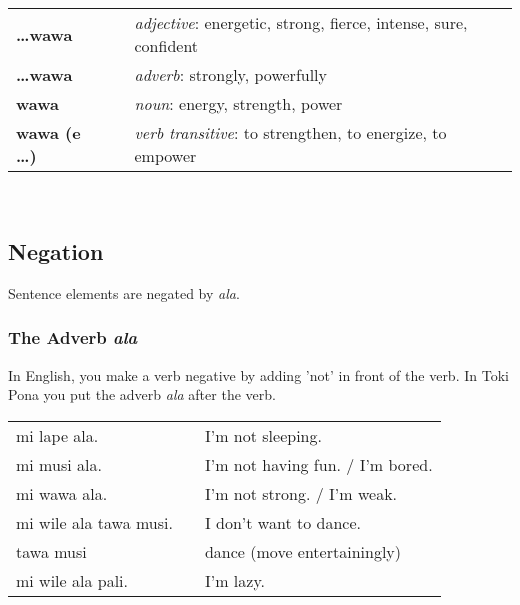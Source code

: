 \begin{supertabular}{p{2,5cm}|ll}
    \textbf{\dots wawa}     &  & \textit{adjective}: energetic, strong, fierce, intense, sure, confident      \\ %
    \textbf{\dots wawa}     &  & \textit{adverb}: strongly, powerfully                                        \\ %
    \textbf{wawa}           &  & \textit{noun}: energy, strength, power                                       \\ %
    \textbf{wawa (e \dots)} &  & \textit{verb transitive}: to strengthen, to energize, to empower             \\ %
\end{supertabular} \\
%
\newpage
%
\subsection*{Negation}
%
%

Sentence elements are negated by \textit{ala}.

\subsubsection*{The Adverb \textit{ala}}
%
%
In English, you make a verb negative by adding 'not' in front of the verb.
In Toki Pona you put the adverb \textit{ala} after the verb.

\begin{supertabular}{p{5,5cm}|ll}
    mi lape ala.           &  & I'm not sleeping.                \\
    mi musi ala.           &  & I'm not having fun. / I'm bored. \\
    mi wawa ala.           &  & I'm not strong. / I'm weak.      \\
    mi wile ala tawa musi. &  & I don't want to dance.           \\
    tawa musi              &  & dance (move entertainingly)      \\
    mi wile ala pali.      &  & I'm lazy.                        \\
\end{supertabular}

